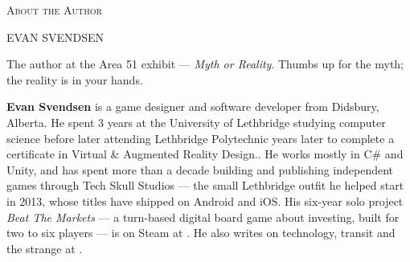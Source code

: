 \clearpage
\thispagestyle{plain}
{}

\begin{center}
{\footnotesize\color{ufogreenink}\scshape About the Author}\par\vspace{3pt}
{\dispfont\LARGE\color{inkblue} EVAN SVENDSEN}\par\vspace{5pt}
\end{center}
\greenrule
\vspace{13pt}\par

\begin{center}
\end{center}
\vspace{3pt}\par
\noindent\begin{minipage}{\linewidth}
{\RaggedRight\scriptsize\color{steel} The author at the Area 51 exhibit --- \emph{Myth or Reality}. Thumbs up
for the myth; the reality is in your hands.\par}
\end{minipage}\par\vspace{13pt}

\noindent\textbf{Evan Svendsen} is a game designer and software developer from Didsbury, Alberta.
He spent 3 years at the University of Lethbridge studying computer science before later attending
Lethbridge Polytechnic years later to complete a certificate in Virtual \& Augmented Reality
Design.. He works mostly in C\# and Unity, and has spent more than a
decade building and publishing independent games through Tech Skull Studios --- the small
Lethbridge outfit he helped start in 2013, whose titles have shipped on Android and iOS. His
six-year solo project \emph{Beat The Markets} --- a turn-based digital board game about investing,
built for two to six players --- is on Steam at
. He also
writes on technology, transit and the strange at .


